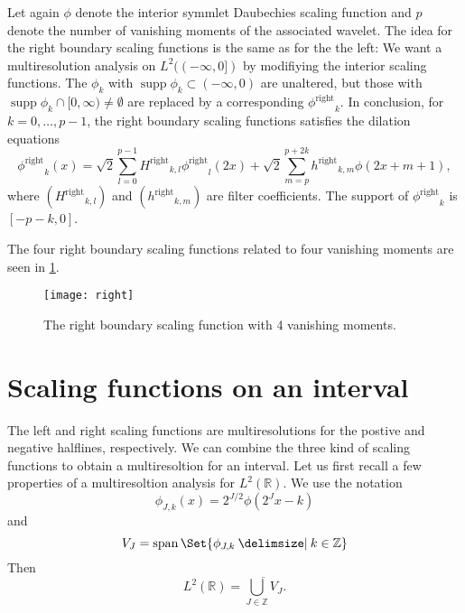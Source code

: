 \documentclass[a4paper]{scrartcl}
\newcommand\rphi{\ensuremath{\phi^{\text{right}}}}
\newcommand\rH{\ensuremath{H^{\text{right}}}}
\newcommand\rh{\ensuremath{h^{\text{right}}}}
\newcommand\R{\ensuremath{\mathbb{R}}}
\newcommand\Z{\ensuremath{\mathbb{Z}}}
\DeclareMathOperator\supp{supp}
\DeclareMathOperator\spn{span}
\newcommand\given{\:\vert\:}
\newcommand\SetSymbol[1][]{
	\nonscript\: #1 \vert \nonscript\:
	\mathopen{} %
	\allowbreak %
}
\renewcommand\given{\SetSymbol[\delimsize]}
\begin{document}
Let again $\phi$ denote the interior symmlet Daubechies scaling function and $p$ denote the number of vanishing moments of the associated wavelet.
The idea for the right boundary scaling functions is the same as for the the left:
We want a multiresolution analysis on $L^2((-\infty,0])$ by modifiying the interior scaling functions.
The $\phi_k$ with $\supp\phi_k \subset (-\infty,0)$ are unaltered, but those with $\supp\phi_k \cap [0, \infty) \neq \emptyset$ are replaced by a corresponding $\rphi_k$.
In conclusion, for $k=0,\ldots,p-1$, the right boundary scaling functions satisfies the dilation equations
\begin{equation}
	\label{eq:right_scaling_function_definition}
	\rphi_k(x)
	= \sqrt2 \sum_{l=0}^{p-1} \rH_{k,l} \rphi_l(2x) + \sqrt2 \sum_{m=p}^{p+2k} \rh_{k,m} \phi(2x+m+1),
\end{equation}
where $(\rH_{k,l})$ and $(\rh_{k,m})$ are filter coefficients.
The support of $\rphi_k$ is $[-p-k,0]$.

The four right boundary scaling functions related to four vanishing moments are seen in \cref{fig:right_Daubechies4}.

\begin{figure}
	\centering
	\texttt{[image: right]}
	\caption{The right boundary scaling function with 4 vanishing moments.}
	\label{fig:right_Daubechies4}
\end{figure}


\section{Scaling functions on an interval}

The left and right scaling functions are multiresolutions for the postive and negative halflines, respectively.
We can combine the three kind of scaling functions to obtain a multiresoltion for an interval.
Let us first recall a few properties of a multiresoltion analysis for $L^2(\R)$.
We use the notation
\begin{equation*}
    \phi_{J,k}(x) = 2^{J/2} \phi(2^J x - k)
\end{equation*}
and 
\begin{equation*}
    V_J = \spn\Set{\phi_{J,k} \given k \in \Z}
\end{equation*}
Then
\begin{equation*}
    L^2(\R) = \overline{\bigcup_{J\in\Z} V_J}.
\end{equation*}
\end{document}
